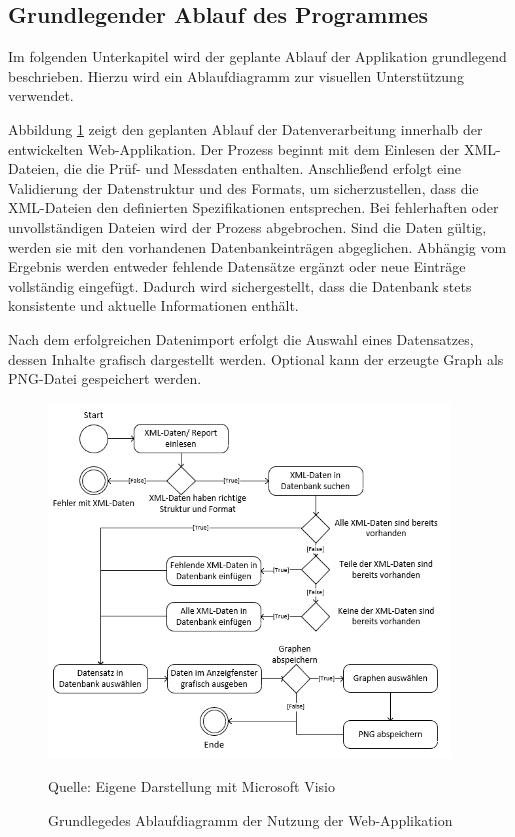 \subsection{Grundlegender Ablauf des Programmes}
\label{subsec:grundlegender-ablauf-des-programmes}

Im folgenden Unterkapitel wird der geplante Ablauf der Applikation grundlegend beschrieben.
Hierzu wird ein Ablaufdiagramm zur visuellen Unterstützung verwendet.

Abbildung \ref{fig: Grundlegedes Ablaufdiagramm der Nutzung der Web-Applikation} zeigt den geplanten Ablauf der Datenverarbeitung innerhalb der entwickelten Web-Applikation.
Der Prozess beginnt mit dem Einlesen der XML-Dateien, die die Prüf- und Messdaten enthalten.
Anschließend erfolgt eine Validierung der Datenstruktur und des Formats, um sicherzustellen, dass die XML-Dateien den definierten Spezifikationen entsprechen.
Bei fehlerhaften oder unvollständigen Dateien wird der Prozess abgebrochen.
Sind die Daten gültig, werden sie mit den vorhandenen Datenbankeinträgen abgeglichen.
Abhängig vom Ergebnis werden entweder fehlende Datensätze ergänzt oder neue Einträge vollständig eingefügt.
Dadurch wird sichergestellt, dass die Datenbank stets konsistente und aktuelle Informationen enthält.

Nach dem erfolgreichen Datenimport erfolgt die Auswahl eines Datensatzes, dessen Inhalte grafisch dargestellt werden.
Optional kann der erzeugte Graph als PNG-Datei gespeichert werden.



\begin{figure}[H]
    \centering
    \includegraphics[width=0.95\textwidth]{Grafiken/Ablaufdiagramm}
    \caption{Grundlegedes Ablaufdiagramm der Nutzung der Web-Applikation}
    \label{fig: Grundlegedes Ablaufdiagramm der Nutzung der Web-Applikation}
    {Quelle: Eigene Darstellung mit Microsoft Visio}
\end{figure}